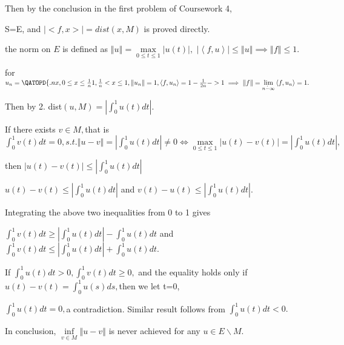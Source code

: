 \documentclass{article}
\begin{document}
Then by the conclusion in the first problem of Coursework 4,

S=E, and $\left\vert <f,x>\right\vert =dist\left( x,M\right) $ is proved
directly.

the norm on $E$ is defined as $\left\Vert u\right\Vert =\underset{0\leq
t\leq 1}{\max }\left\vert u\left( t\right) \right\vert ,$ $\left\vert
\left\langle f,u\right\rangle \right\vert \leq \left\Vert u\right\Vert
\implies \left\Vert f\right\Vert \leq 1.$

for $u_{n}=\QATOPD\{ . {nx,0\leq x\leq \frac{1}{n}}{1,\frac{1}{n}<x\leq
1},\left\Vert u_{n}\right\Vert =1,\left\langle f,u_{n}\right\rangle =1-\frac{%
1}{2n}->1\implies \left\Vert f\right\Vert =\underset{n\dot{-}\infty }{\lim }%
\left\langle f,u_{n}\right\rangle =1.$

Then by 2. dist$\left( u,M\right) =\left\vert \int_{0}^{1}u\left( t\right)
dt\right\vert .$

If there exists $v\in M,$that is $\int_{0}^{1}v\left( t\right)
dt=0,s.t.\left\Vert u-v\right\Vert =\left\vert \int_{0}^{1}u\left( t\right)
dt\right\vert \neq 0\iff \underset{0\leq t\leq 1}{\max }\left\vert u\left(
t\right) -v\left( t\right) \right\vert =\left\vert \int_{0}^{1}u\left(
t\right) dt\right\vert ,$

then $\left\vert u\left( t\right) -v\left( t\right) \right\vert \leq
\left\vert \int_{0}^{1}u\left( t\right) dt\right\vert $

$u\left( t\right) -v\left( t\right) \leq \left\vert \int_{0}^{1}u\left(
t\right) dt\right\vert $ and $v\left( t\right) -u\left( t\right) \leq
\left\vert \int_{0}^{1}u\left( t\right) dt\right\vert .$

Integrating the above two inequalities from 0 to 1 gives

$\int_{0}^{1}v\left( t\right) dt\geq \left\vert \int_{0}^{1}u\left( t\right)
dt\right\vert -\int_{0}^{1}u\left( t\right) dt$ and $\int_{0}^{1}v\left(
t\right) dt\leq \left\vert \int_{0}^{1}u\left( t\right) dt\right\vert
+\int_{0}^{1}u\left( t\right) dt.$

If $\int_{0}^{1}u\left( t\right) dt>0,\int_{0}^{1}v\left( t\right) dt\geq 0,$
and the equality holds only if $u\left( t\right) -v\left( t\right)
=\int_{0}^{1}u\left( s\right) ds,$then we let t=0,

$\int_{0}^{1}u\left( t\right) dt=0,$a contradiction. Similar result follows
from $\int_{0}^{1}u\left( t\right) dt<0.$

In conclusion, $\underset{v\in M}{\inf }\left\Vert u-v\right\Vert $ is never
achieved for any $u\in E\backslash M.$

\bigskip

\bigskip

\bigskip
\end{document}

